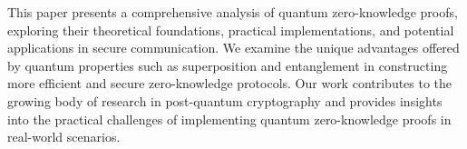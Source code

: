 This paper presents a comprehensive analysis of quantum zero-knowledge proofs, exploring their theoretical foundations, practical implementations, and potential applications in secure communication. We examine the unique advantages offered by quantum properties such as superposition and entanglement in constructing more efficient and secure zero-knowledge protocols. Our work contributes to the growing body of research in post-quantum cryptography and provides insights into the practical challenges of implementing quantum zero-knowledge proofs in real-world scenarios.
